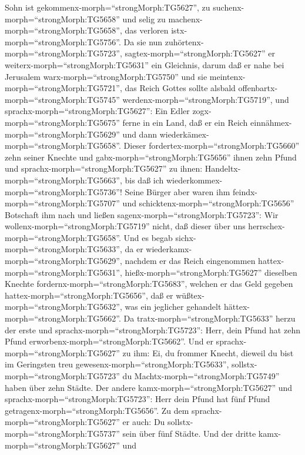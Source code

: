 Sohn ist gekommenx-morph=``strongMorph:TG5627'', zu
suchenx-morph=``strongMorph:TG5658'' und selig zu
machenx-morph=``strongMorph:TG5658'', das verloren
istx-morph=``strongMorph:TG5756''.  Da sie nun
zuhörtenx-morph=``strongMorph:TG5723'',
sagtex-morph=``strongMorph:TG5627'' er
weiterx-morph=``strongMorph:TG5631'' ein Gleichnis, darum daß er nahe
bei Jerusalem warx-morph=``strongMorph:TG5750'' und sie
meintenx-morph=``strongMorph:TG5721'', das Reich Gottes sollte alsbald
offenbartx-morph=``strongMorph:TG5745''
werdenx-morph=``strongMorph:TG5719'',  und
sprachx-morph=``strongMorph:TG5627'': Ein Edler
zogx-morph=``strongMorph:TG5675'' ferne in ein Land, daß er ein Reich
einnähmex-morph=``strongMorph:TG5629'' und dann
wiederkämex-morph=``strongMorph:TG5658''.  Dieser
fordertex-morph=``strongMorph:TG5660'' zehn seiner Knechte und
gabx-morph=``strongMorph:TG5656'' ihnen zehn Pfund und
sprachx-morph=``strongMorph:TG5627'' zu ihnen:
Handeltx-morph=``strongMorph:TG5663'', bis daß ich
wiederkommex-morph=``strongMorph:TG5736''!  Seine Bürger
aber waren ihm feindx-morph=``strongMorph:TG5707'' und
schicktenx-morph=``strongMorph:TG5656'' Botschaft ihm nach und ließen
sagenx-morph=``strongMorph:TG5723'': Wir
wollenx-morph=``strongMorph:TG5719'' nicht, daß dieser über uns
herrschex-morph=``strongMorph:TG5658''.  Und es begab
sichx-morph=``strongMorph:TG5633'', da er
wiederkamx-morph=``strongMorph:TG5629'', nachdem er das Reich
eingenommen hattex-morph=``strongMorph:TG5631'',
hießx-morph=``strongMorph:TG5627'' dieselben Knechte
fordernx-morph=``strongMorph:TG5683'', welchen er das Geld gegeben
hattex-morph=``strongMorph:TG5656'', daß er
wüßtex-morph=``strongMorph:TG5632'', was ein jeglicher gehandelt
hättex-morph=``strongMorph:TG5662''.  Da
tratx-morph=``strongMorph:TG5633'' herzu der erste und
sprachx-morph=``strongMorph:TG5723'': Herr, dein Pfund hat zehn Pfund
erworbenx-morph=``strongMorph:TG5662''.  Und er
sprachx-morph=``strongMorph:TG5627'' zu ihm: Ei, du frommer Knecht,
dieweil du bist im Geringsten treu
gewesenx-morph=``strongMorph:TG5633'',
sollstx-morph=``strongMorph:TG5723'' du
Machtx-morph=``strongMorph:TG5749'' haben über zehn Städte.
 Der andere kamx-morph=``strongMorph:TG5627'' und
sprachx-morph=``strongMorph:TG5723'': Herr dein Pfund hat fünf Pfund
getragenx-morph=``strongMorph:TG5656''.  Zu dem
sprachx-morph=``strongMorph:TG5627'' er auch: Du
sollstx-morph=``strongMorph:TG5737'' sein über fünf Städte.
 Und der dritte kamx-morph=``strongMorph:TG5627'' und
